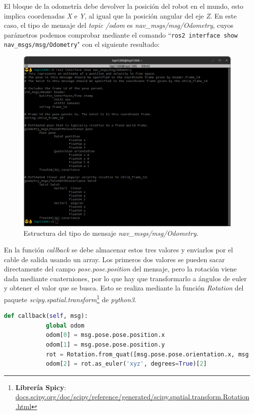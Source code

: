 El bloque de la odometría debe devolver la posición del robot en el mundo, esto implica coordenadas \textit{X} e \textit{Y}, al igual que la
posición angular del eje \textit{Z}. En este caso, el tipo de mensaje del \textit{topic /odom} es \textit{nav\_msgs/msg/Odometry},
cuyos parámetros podemos comprobar mediante el comando ``\lstinline|ros2 interface show nav_msgs/msg/Odometry|" con el siguiente resultado:
\begin{figure} [H]
    \begin{center}
        \includegraphics[width=12cm]{figs/c6/odom_msg.png}
    \end{center}
    \caption[Estructura mensaje Odometría]{Estructura del tipo de mensaje \textit{nav\_msgs/msg/Odometry}.}
    \label{fig:odom_struct}
\end{figure}

En la función \textit{callback} se debe almacenar estos tres valores y enviarlos por el cable de salida usando un array. Los primeros
dos valores se pueden sacar directamente del campo \textit{pose.pose.position} del mensaje, pero la rotación viene dada mediante
cuaterniones, por lo que hay que transformarlo a ángulos de euler y obtener el valor que se busca. Esto se realiza mediante la
función \textit{Rotation} del paquete
\textit{scipy.spatial.transform}\footnote{\textbf{Librería Spicy}: \url{docs.scipy.org/doc/scipy/reference/generated/scipy.spatial.transform.Rotation.html}}
de \textit{python3}.
\begin{code}[H]
    \begin{lstlisting}[language=python]
        def callback(self, msg):
            global odom
            odom[0] = msg.pose.pose.position.x
            odom[1] = msg.pose.pose.position.y
            rot = Rotation.from_quat([msg.pose.pose.orientation.x, msg.pose.pose.orientation.y, msg.pose.pose.orientation.z, msg.pose.pose.orientation.w])
            odom[2] = rot.as_euler('xyz', degrees=True)[2]
    \end{lstlisting}
    \caption[Funciones para obtener la fuerza repulsiva]{Funciones para obtener la fuerza repulsiva.}
    \label{cod:rep_vel}
\end{code}

